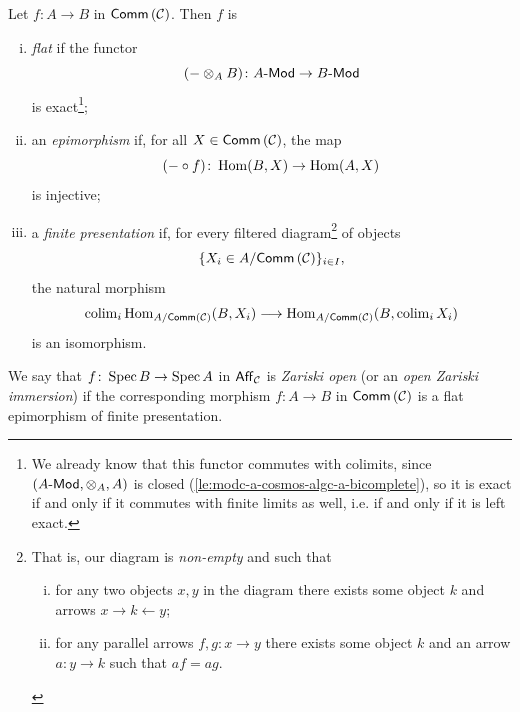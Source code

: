         \begin{definition}\label{df:zariski-open-morphism}
            Let $f\colon A\to B$ in $\mathsf{Comm}\left({\mathcal{C}}\right)$.
            Then $f$ is
            \begin{enumerate}[(i)]
                \item \emph{flat} if the functor
                    \begin{equation*}
                        ({-}\otimes_A B)\colon{{A}\hbox{-}\mathsf{Mod}}\to{{B}\hbox{-}\mathsf{Mod}}
                    \end{equation*}
                    is exact\footnote{
                        We already know that this functor commutes with colimits, since $({{A}\hbox{-}\mathsf{Mod}},\otimes_A,A)$ is closed (\cref{le:modc-a-cosmos-algc-a-bicomplete}), so it is exact if and only if it commutes with finite limits as well, i.e. if and only if it is left exact.
                    };
                \item an \emph{epimorphism} if, for all $X\in\mathsf{Comm}\left({\mathcal{C}}\right)$, the map
                    \begin{equation*}
                        ({-}\circ f)\colon\operatorname{Hom}(B,X)\to\operatorname{Hom}(A,X)
                    \end{equation*}
                    is injective;
                \item a \emph{finite presentation} if, for every filtered diagram\footnote{
                        That is, our diagram is \emph{non-empty} and such that
                        \begin{enumerate}[(i)]
                            \item for any two objects $x,y$ in the diagram there exists some object $k$ and arrows \mbox{$x\to k\leftarrow y$};
                            \item for any parallel arrows $f,g\colon x\to y$ there exists some object $k$ and an arrow $a\colon y\to k$ such that $af=ag$.
                        \end{enumerate}
                    } of objects
                    \begin{equation*}
                        \{X_i\in A/\mathsf{Comm}\left({\mathcal{C}}\right)\}_{i\in I},
                    \end{equation*}
                    the natural morphism
                    \begin{equation*}
                        \operatorname{colim}_i\operatorname{Hom}_{A/\mathsf{Comm}\left({\mathcal{C}}\right)}(B,X_i) \longrightarrow \operatorname{Hom}_{A/\mathsf{Comm}\left({\mathcal{C}}\right)}(B,\operatorname{colim}_i X_i)
                    \end{equation*}
                    is an isomorphism.
            \end{enumerate}
            We say that $f\colon\operatorname{Spec} B\to\operatorname{Spec} A$ in $\mathsf{Aff}_{\mathcal{C}}$ is \emph{Zariski open} (or an \emph{open Zariski immersion}) if the corresponding morphism $f\colon A\to B$ in $\mathsf{Comm}\left({\mathcal{C}}\right)$ is a flat epimorphism of finite presentation.
        \end{definition}

